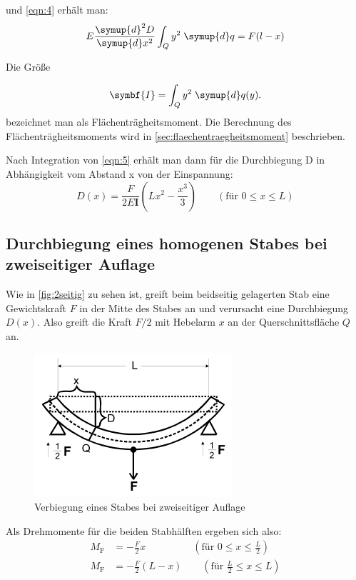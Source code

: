 und \autoref{eqn:4} erhält man:
\begin{equation}
    E \frac{ \symup{d}^{ 2 }D }{ \symup{d}x^{ 2 } } \int_Q y^2 \; \symup{d} q =F(l-x)
	\label{eqn:5}
\end{equation}

Die Größe 

\begin{equation}
    \symbf{I} = \int_Q y^2 \; \symup{d} q(y).
    \label{eqn:traegheit}
\end{equation}
bezeichnet man als Flächenträgheitsmoment. Die Berechnung des Flächenträgheitsmoments wird in \autoref{sec:flaechentraegheitsmoment} beschrieben.

Nach Integration von \autoref{eqn:5} erhält man dann für die Durchbiegung D in Abhängigkeit vom Abstand x von der Einspannung:
\begin{equation}
    D(x) = \frac{F}{2 E \symbf{I}} \left(L x^2 - \frac{x^3}{3} \right) 
    \qquad (\text{für } 0 \leq x \leq L)
    \label{eqn:Biegung}
\end{equation}



\subsection{Durchbiegung eines homogenen Stabes bei zweiseitiger Auflage}
Wie in \autoref{fig:2seitig} zu sehen ist, greift beim beidseitig gelagerten Stab eine Gewichtskraft $F$ in der Mitte des Stabes an und verursacht eine Durchbiegung $D(x)$. Also greift die Kraft $F/2$ mit Hebelarm $x$ an der Querschnittsfläche $Q$ an.
\begin{figure}
	\centering
	\includegraphics{durchbiegung_zweiseitig.PNG}
	\caption{Verbiegung eines Stabes bei zweiseitiger Auflage \cite{sample}}
	\label{fig:2seitig}
\end{figure}
Als Drehmomente für die beiden Stabhälften ergeben sich also: 
\begin{align}
    M_\text{F} &= - \frac{F}{2} x \qquad \qquad \; \; \,
    (\text{für } 0 \leq x \leq \frac{L}{2})\\
    M_\text{F} &= - \frac{F}{2} (L - x) \qquad (\text{für } \frac{L}{2} \leq x \leq L)
\end{align}

